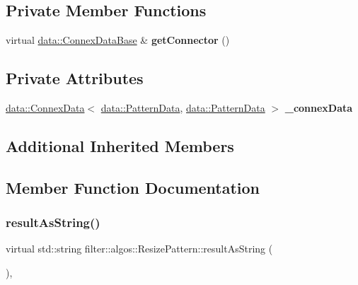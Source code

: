 \subsection*{Private Member Functions}
\begin{DoxyCompactItemize}
\item 
\mbox{\label{classfilter_1_1algos_1_1_resize_pattern_a0a0fb3c77bdedf25e791ed06ea18cf7e}} 
virtual \hyperlink{classfilter_1_1data_1_1_connex_data_base}{data\+::\+Connex\+Data\+Base} \& {\bfseries get\+Connector} ()
\end{DoxyCompactItemize}
\subsection*{Private Attributes}
\begin{DoxyCompactItemize}
\item 
\mbox{\label{classfilter_1_1algos_1_1_resize_pattern_ac4c9bb4837ef303215430b0aa81c0bc0}} 
\hyperlink{classfilter_1_1data_1_1_connex_data}{data\+::\+Connex\+Data}$<$ \hyperlink{classfilter_1_1data_1_1_pattern_data}{data\+::\+Pattern\+Data}, \hyperlink{classfilter_1_1data_1_1_pattern_data}{data\+::\+Pattern\+Data} $>$ {\bfseries \+\_\+connex\+Data}
\end{DoxyCompactItemize}
\subsection*{Additional Inherited Members}


\subsection{Member Function Documentation}
\mbox{\label{classfilter_1_1algos_1_1_resize_pattern_ae36ff1d98ef8f2dd32ba5b7a3a50152f}} 
\subsubsection{\texorpdfstring{result\+As\+String()}{resultAsString()}}
{\footnotesize\ttfamily virtual std\+::string filter\+::algos\+::\+Resize\+Pattern\+::result\+As\+String (\begin{DoxyParamCaption}{ }\end{DoxyParamCaption})\hspace{0.3cm}{\ttfamily [inline]}, {\ttfamily [virtual]}}

